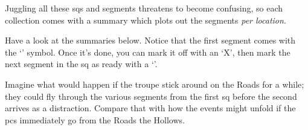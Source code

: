 \begin{multicols}{2}

\noindent
Juggling all these \glspl{sq} and \glspl{segment} threatens to become confusing, so each collection comes with a summary which plots out the \glspl{segment} \emph{per location}.

Have a look at the summaries below.
Notice that the first \gls{segment} comes with the `\sqr' symbol.
Once it's done, you can mark it off with an `X', then mark the next \gls{segment} in the \gls{sq} as ready with a `\sqr'.

Imagine what would happen if the troupe stick around on the Roads for a while; they could fly through the various \glspl{segment} from the first \gls{sq} before the second arrives as a distraction.
Compare that with how the events might unfold if the \glspl{pc} immediately go from the Roads the Hollows.

\end{multicols}


